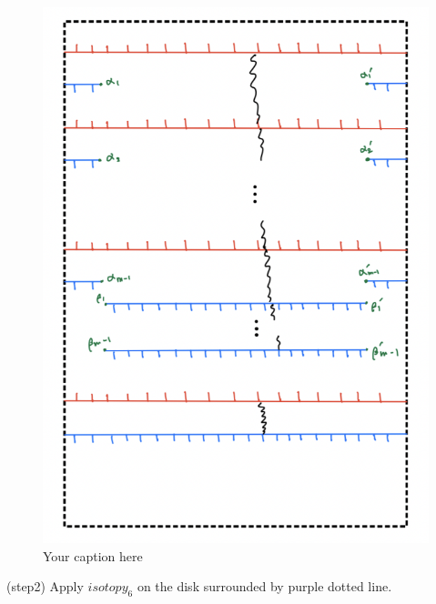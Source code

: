 \begin{figure}[H] %
    \centering
    \includegraphics[width=\linewidth]{diagrams/lemma7/4.png} %
    \caption{Your caption here}
    \label{fig:your-label}
\end{figure}
    
(step2) Apply $isotopy_6$ on the disk surrounded by purple dotted line.   

